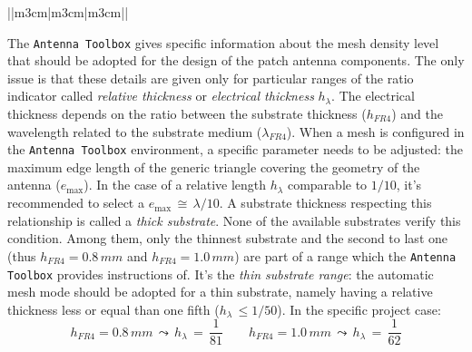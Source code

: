 \documentclass[12pt,a4paper]{article}
\begin{document}
{\begin{table}[h]
\begin{center}
{\begin{tabular}{||m{3cm}|m{3cm}|m{3cm}||}
	\end{tabular}}\end{center}\end{table}
	\FloatBarrier
	The \texttt{\color{Mahogany}Antenna Toolbox} gives specific
	information about the mesh density level that should be adopted for the design of the patch antenna components. The only issue is that these details are given only for particular ranges of the ratio indicator called \emph{relative thickness} or \emph{electrical thickness} $h_{\lambda}$. The electrical thickness depends on the ratio between the substrate thickness ($h_{FR4}$) and the wavelength related to the substrate medium ($\lambda_{FR4}$). When a mesh is configured in the \texttt{\color{Mahogany}Antenna Toolbox} environment, a specific parameter needs to be adjusted: the maximum edge length of the generic triangle covering the geometry of the antenna ($e_{\max}$). In the case of a relative length $h_\lambda$ comparable to $1/10$, it's recommended to select a $e_{\max}\,\cong\,\lambda/10$. A substrate thickness respecting this relationship is called a \emph{thick substrate}. None of the available substrates verify this condition. Among them, only the thinnest substrate and the second to last one (thus $h_{FR4}=0.8\,mm$ and $h_{FR4}=1.0\,mm$) are part of a range which the \texttt{\color{Mahogany}Antenna Toolbox} provides instructions of. It's the \emph{thin substrate range}: the automatic mesh mode should be adopted for a thin substrate, namely having a relative thickness less or equal than one fifth ($h_\lambda\,\leq{1/50}$). In the specific project case: 
	\begin{equation}
		h_{FR4}=0.8\,mm\,\leadsto\,h_{\lambda}\,=\,\frac{1}{81}\qquad 	h_{FR4}=1.0\,mm\,\leadsto\,h_{\lambda}\,=\,\frac{1}{62}
	\end{equation}
	\begin{center}
	\end{center}
	
}
\end{document}
